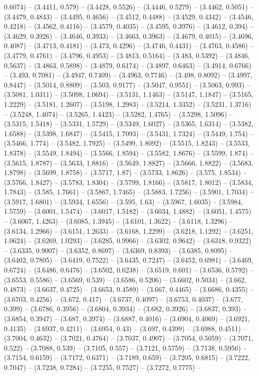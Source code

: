 0.6074) -- (3.4411, 0.579) -- (3.4428, 0.5526) -- (3.4446, 0.5279) -- (3.4462, 0.5051) -- (3.4479, 0.4843) -- (3.4495, 0.4656) -- (3.4512, 0.4488) -- (3.4529, 0.4342) -- (3.4546, 0.4218) -- (3.4562, 0.4116) -- (3.4579, 0.4035) -- (3.4595, 0.3976) -- (3.4612, 0.394) -- (3.4629, 0.3926) -- (3.4646, 0.3933) -- (3.4663, 0.3963) -- (3.4679, 0.4015) -- (3.4696, 0.4087) -- (3.4713, 0.4181) -- (3.473, 0.4296) -- (3.4746, 0.4431) -- (3.4763, 0.4586) -- (3.4779, 0.4761) -- (3.4796, 0.4953) -- (3.4813, 0.5164) -- (3.483, 0.5392) -- (3.4846, 0.5637) -- (3.4863, 0.5898) -- (3.4879, 0.6174) -- (3.4897, 0.6463) -- (3.4914, 0.6766) -- (3.493, 0.7081) -- (3.4947, 0.7409) -- (3.4963, 0.7746) -- (3.498, 0.8092) -- (3.4997, 0.8447) -- (3.5014, 0.8809) -- (3.503, 0.9177) -- (3.5047, 0.9551) -- (3.5063, 0.993) -- (3.5081, 1.0311) -- (3.5098, 1.0694) -- (3.5131, 1.1463) -- (3.5147, 1.1847) -- (3.5165, 1.2229) -- (3.5181, 1.2607) -- (3.5198, 1.2983) -- (3.5214, 1.3352) -- (3.5231, 1.3716) -- (3.5248, 1.4074) -- (3.5265, 1.4423) -- (3.5282, 1.4765) -- (3.5298, 1.5096) -- (3.5315, 1.5418) -- (3.5331, 1.5729) -- (3.5349, 1.6027) -- (3.5365, 1.6314) -- (3.5382, 1.6588) -- (3.5398, 1.6847) -- (3.5415, 1.7093) -- (3.5431, 1.7324) -- (3.5449, 1.754) -- (3.5466, 1.774) -- (3.5482, 1.7925) -- (3.5499, 1.8092) -- (3.5515, 1.8243) -- (3.5533, 1.8378) -- (3.5549, 1.8494) -- (3.5566, 1.8594) -- (3.5582, 1.8676) -- (3.5599, 1.874) -- (3.5615, 1.8787) -- (3.5633, 1.8816) -- (3.5649, 1.8827) -- (3.5666, 1.8822) -- (3.5683, 1.8798) -- (3.5699, 1.8758) -- (3.5717, 1.87) -- (3.5733, 1.8626) -- (3.575, 1.8534) -- (3.5766, 1.8427) -- (3.5783, 1.8304) -- (3.5799, 1.8166) -- (3.5817, 1.8012) -- (3.5834, 1.7843) -- (3.585, 1.7661) -- (3.5867, 1.7465) -- (3.5883, 1.7256) -- (3.5901, 1.7034) -- (3.5917, 1.6801) -- (3.5934, 1.6556) -- (3.595, 1.63) -- (3.5967, 1.6035) -- (3.5984, 1.5759) -- (3.6001, 1.5474) -- (3.6017, 1.5182) -- (3.6034, 1.4882) -- (3.6051, 1.4575) -- (3.6067, 1.4263) -- (3.6085, 1.3945) -- (3.6101, 1.3622) -- (3.6118, 1.3296) -- (3.6134, 1.2966) -- (3.6151, 1.2633) -- (3.6168, 1.2299) -- (3.6218, 1.1292) -- (3.6251, 1.0624) -- (3.6269, 1.0293) -- (3.6285, 0.9966) -- (3.6302, 0.9642) -- (3.6318, 0.9322) -- (3.6335, 0.9007) -- (3.6352, 0.8697) -- (3.6369, 0.8393) -- (3.6385, 0.8095) -- (3.6402, 0.7805) -- (3.6419, 0.7522) -- (3.6435, 0.7247) -- (3.6452, 0.6981) -- (3.6469, 0.6724) -- (3.6486, 0.6476) -- (3.6502, 0.6238) -- (3.6519, 0.601) -- (3.6536, 0.5792) -- (3.6553, 0.5586) -- (3.6569, 0.539) -- (3.6586, 0.5206) -- (3.6602, 0.5034) -- (3.662, 0.4873) -- (3.6637, 0.4725) -- (3.6653, 0.4589) -- (3.667, 0.4465) -- (3.6686, 0.4355) -- (3.6703, 0.4256) -- (3.672, 0.417) -- (3.6737, 0.4097) -- (3.6753, 0.4037) -- (3.677, 0.399) -- (3.6786, 0.3956) -- (3.6804, 0.3934) -- (3.682, 0.3926) -- (3.6837, 0.393) -- (3.6854, 0.3947) -- (3.687, 0.3974) -- (3.6887, 0.4016) -- (3.6904, 0.4069) -- (3.6921, 0.4135) -- (3.6937, 0.4211) -- (3.6954, 0.43) -- (3.697, 0.4399) -- (3.6988, 0.4511) -- (3.7004, 0.4632) -- (3.7021, 0.4764) -- (3.7037, 0.4907) -- (3.7054, 0.5059) -- (3.7071, 0.522) -- (3.7088, 0.539) -- (3.7105, 0.557) -- (3.7121, 0.5759) -- (3.7138, 0.5956) -- (3.7154, 0.6159) -- (3.7172, 0.6371) -- (3.7189, 0.659) -- (3.7205, 0.6815) -- (3.7222, 0.7047) -- (3.7238, 0.7284) -- (3.7255, 0.7527) -- (3.7272, 0.7775) -- 